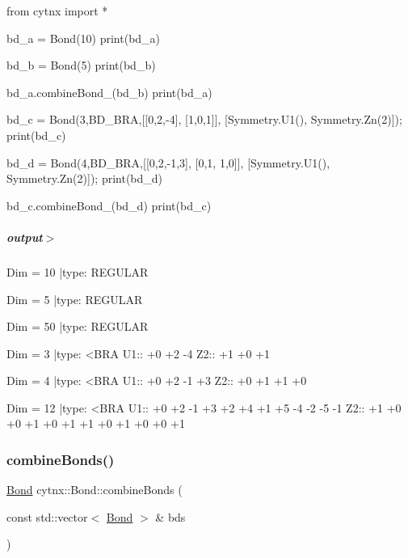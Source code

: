 \begin{DoxyCodeInclude}
\textcolor{keyword}{from} cytnx \textcolor{keyword}{import} *

bd\_a = Bond(10)
print(bd\_a)

bd\_b = Bond(5)
print(bd\_b)

bd\_a.combineBond\_(bd\_b)
print(bd\_a)


bd\_c = Bond(3,BD\_BRA,[[0,2,-4],
                      [1,0,1]],
                  [Symmetry.U1(),
                   Symmetry.Zn(2)]);
print(bd\_c)                                

bd\_d = Bond(4,BD\_BRA,[[0,2,-1,3],
                      [0,1, 1,0]],
                     [Symmetry.U1(),
                      Symmetry.Zn(2)]);
print(bd\_d)
    
bd\_c.combineBond\_(bd\_d)
print(bd\_c)

\end{DoxyCodeInclude}
 \subparagraph*{output$>$}


\begin{DoxyVerbInclude}
Dim = 10 |type: REGULAR 

Dim = 5 |type: REGULAR 

Dim = 50 |type: REGULAR 

Dim = 3 |type: <BRA     
 U1::  +0 +2 -4
 Z2::  +1 +0 +1

Dim = 4 |type: <BRA     
 U1::  +0 +2 -1 +3
 Z2::  +0 +1 +1 +0

Dim = 12 |type: <BRA     
 U1::  +0 +2 -1 +3 +2 +4 +1 +5 -4 -2 -5 -1
 Z2::  +1 +0 +0 +1 +0 +1 +1 +0 +1 +0 +0 +1







\end{DoxyVerbInclude}
 \mbox{\label{classcytnx_1_1Bond_a4a1d060cf2d0c44d83356df757a802d1}} 
\subsubsection{\texorpdfstring{combine\+Bonds()}{combineBonds()}}
{\footnotesize\ttfamily \hyperlink{classcytnx_1_1Bond}{Bond} cytnx\+::\+Bond\+::combine\+Bonds (\begin{DoxyParamCaption}\item[{const std\+::vector$<$ \hyperlink{classcytnx_1_1Bond}{Bond} $>$ \&}]{bds }\end{DoxyParamCaption})\hspace{0.3cm}{\ttfamily [inline]}}



